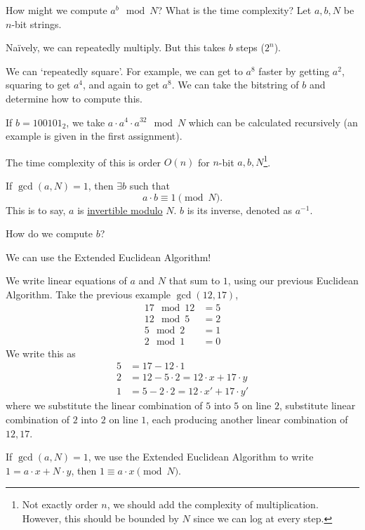 \begin{ques*}
    How might we compute $a^b\mod N$? What is the time complexity? Let $a, b, N$ be $n$-bit strings.
\end{ques*}

Na\"ively, we can repeatedly multiply. But this takes $b$ steps ($2^n$).

We can `repeatedly square'. For example, we can get to $a^8$ faster by getting $a^2$, squaring to get $a^4$, and again to get $a^8$. We can take the bitstring of $b$ and determine how to compute this.

\begin{example*}
    If $b = 100101_2$, we take $a\cdot a^4\cdot a^{32}\mod N$ which can be calculated recursively (an example is given in the first assignment).
\end{example*}

The time complexity of this is order $O(n)$ for $n$-bit $a, b, N$\footnote{Not exactly order $n$, we should add the complexity of multiplication. However, this should be bounded by $N$ since we can log at every step.}.

\begin{theorem}
    If $\gcd(a,N) = 1$, then $\exists b$ such that
    \[a\cdot b \equiv 1\pmod{N}.\]
    This is to say, $a$ is \ul{invertible modulo} $N$. $b$ is its inverse, denoted as $a^{-1}$.
\end{theorem}
\begin{ques*}
    How do we compute $b$?
\end{ques*}
We can use the Extended Euclidean Algorithm!
\begin{example*}
    We write linear equations of $a$ and $N$ that sum to $1$, using our previous Euclidean Algorithm. Take the previous example $\gcd(12, 17)$,
    \begin{align*}
        17\mod{12} & = 5 \\
        12 \mod{5} & = 2 \\
        5\mod{2}   & = 1 \\
        2\mod{1}   & = 0
    \end{align*}
    We write this as
    \begin{align*}
        5 & = 17 - 12\cdot 1                         \\
        2 & = 12 - 5\cdot 2 = 12\cdot x + 17\cdot y  \\
        1 & = 5 - 2\cdot 2 = 12\cdot x' + 17\cdot y'
    \end{align*}
    where we substitute the linear combination of $5$ into $5$ on line $2$, substitute linear combination of $2$ into $2$ on line $1$, each producing another linear combination of $12, 17$.

    If $\gcd(a, N) = 1$, we use the Extended Euclidean Algorithm to write $1 = a\cdot x + N\cdot y$, then $1\equiv a\cdot x\pmod{N}$.
\end{example*}

